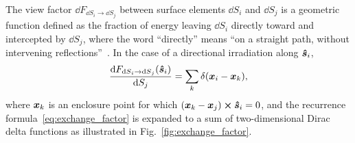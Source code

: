 \documentclass[final]{elsarticle} %
\newcommand{\viewfactor}[3]{{#1}_{\dd{S}#2\to\dd{S}#3}}
\newcommand{\dviewfactor}[4][]{{\dv{\viewfactor{#2}{#3}{#4}#1}{S#4}}}
\newcommand{\bs}{\vu*{s}}
\newcommand{\bx}{\vb*{x}}
\begin{document}
The view factor $\dd\viewfactor{F}{_i}{_j}$ between surface elements $\dd{S_i}$ and $\dd{S_j}$
is a geometric function defined as the fraction of energy leaving $\dd{S_i}$ directly toward
and intercepted by $\dd{S_j}$, where the word ``directly'' means ``on a straight path,
without intervening reflections''~\cite{modest2013radiative}.
In the case of a directional irradiation along $\bs_i$,
\begin{equation}\label{eq:view_factor}
    \dviewfactor[(\bs_i)]{F}{_i}{_j} = \sum_k\delta(\bx_i-\bx_k),
\end{equation}
where $\bx_k$ is an enclosure point for which $(\bx_k-\bx_j)\cp\bs_i = 0$,
and the recurrence formula~\eqref{eq:exchange_factor} is expanded to a sum of two-dimensional
Dirac delta functions as illustrated in Fig.~\ref{fig:exchange_factor}.
\end{document}
